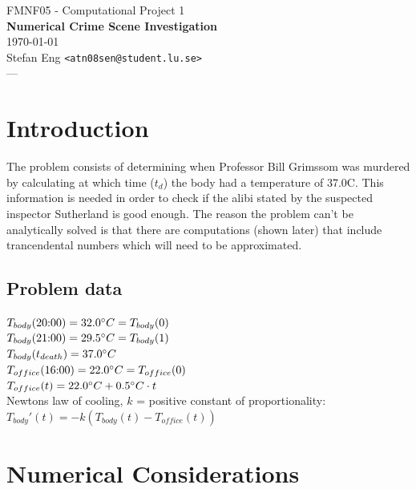 \documentclass{article}
\begin{document}
\begin{center}
  {\small FMNF05 - Computational Project 1} \\
  {\Large\textbf{Numerical Crime Scene Investigation}} \\
  \vspace{0.4cm}
  \today\\
  \vspace{0.2cm}
  Stefan Eng \texttt{<atn08sen@student.lu.se>} \\
  \vspace{0.4cm}
  {\Large ---} \\
\end{center}

\section*{Introduction}

The problem consists of determining when Professor Bill Grimssom was
murdered by calculating at which time ($t_d$) the body had a temperature of
37.0{\degree}C. This information is needed in order to check if the alibi
stated by the suspected inspector Sutherland is good enough. The reason the
problem can't be analytically solved is that there are computations (shown
later) that include trancendental numbers which will need to be approximated.

\subsection*{Problem data}

  $T_{body}(\textrm{20:00}) = 32.0{\degree}C = T_{body}(0)$\\
  $T_{body}(\textrm{21:00}) = 29.5{\degree}C = T_{body}(1)$\\
  $T_{body}(t_{death}) = 37.0\degree{C} $ \\

  \noindent
  $T_{office}(\textrm{16:00}) = 22.0{\degree}C = T_{office}(0) $\\
  $T_{office}(t) = 22.0{\degree}C + 0.5{\degree}C \cdot t $ \\

  \noindent
  Newtons law of cooling, $k$ = positive constant of proportionality: \\
  $T_{body}'(t) = -k(T_{body}(t) - T_{office}(t))$

\section*{Numerical Considerations}
\end{document}
